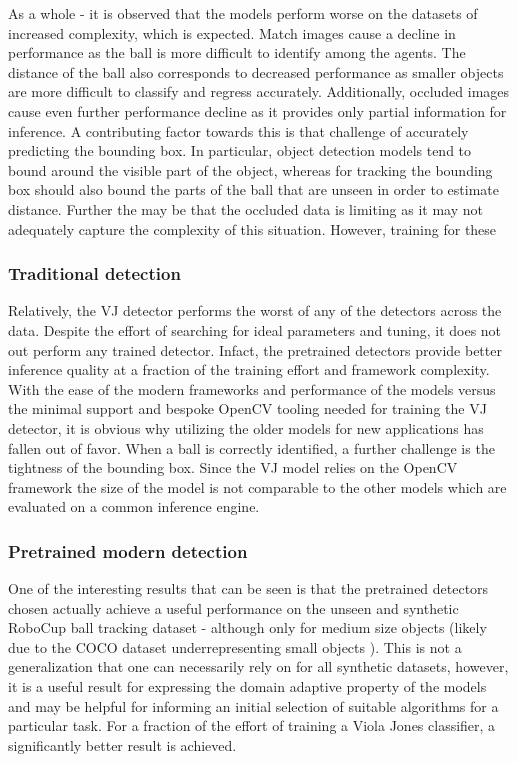 \documentclass[a4paper,twoside,12pt]{report}
\begin{document}
As a whole - it is observed that the models perform worse on the datasets of increased complexity, which is expected. Match images cause a decline in performance as the ball is more difficult to identify among the agents. The distance of the ball also corresponds to decreased performance as smaller objects are more difficult to classify and regress accurately. Additionally, occluded images cause even further performance decline as it provides only partial information for inference. A contributing factor towards this is that challenge of accurately predicting the bounding box. In particular, object detection models tend to bound around the visible part of the object, whereas for tracking the bounding box should also bound the parts of the ball that are unseen in order to estimate distance. Further the may be that the occluded data is limiting as it may not adequately capture the complexity of this situation. However, training for these 

\subsubsection{Traditional detection}

Relatively, the VJ detector performs the worst of any of the detectors across the data. Despite the effort of searching for ideal parameters and tuning, it does not out perform any trained detector. Infact, the pretrained detectors provide better inference quality at a fraction of the training effort and framework complexity. With the ease of the modern frameworks and performance of the models versus the minimal support and bespoke OpenCV tooling needed for training the VJ detector, it is obvious why utilizing the older models for new applications has fallen out of favor. When a ball is correctly identified, a further challenge is the tightness of the bounding box. Since the VJ model relies on the OpenCV framework the size of the model is not comparable to the other models which are evaluated on a common inference engine.

\subsubsection{Pretrained modern detection}

One of the interesting results that can be seen is that the pretrained detectors chosen actually achieve a useful performance on the unseen and synthetic RoboCup ball tracking dataset - although only for medium size objects (likely due to the COCO dataset underrepresenting small objects \citep{smallcoco}). This is not a generalization that one can necessarily rely on for all synthetic datasets, however, it is a useful result for expressing the domain adaptive property of the models and may be helpful for informing an initial selection of suitable algorithms for a particular task. For a fraction of the effort of training a Viola Jones classifier, a significantly better result is achieved.
\end{document}
